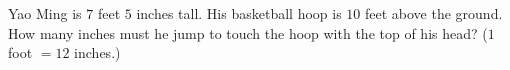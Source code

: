 Yao Ming is $7$ feet $5$ inches tall. His basketball hoop is $10$ feet above the ground. How many inches must he jump to touch the hoop with the top of his head? ($1$ foot $=12$ inches.)
